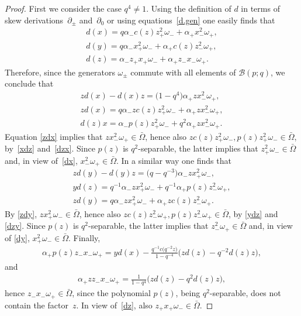 \documentclass[pdftex]{sigma}
\numberwithin{equation}{section}
\def\Weyl#1#2{{\mathcal{B}}(#1;#2)}
\begin{document}
\begin{proof}
First we consider the case $q^4\neq 1$. Using the def\/inition of $d$ in terms of skew derivations~$\partial_\pm$ and~$\partial_0$ or using equations~\eqref{d.gen} one easily f\/inds that
\begin{subequations}\label{d.gen.B}
\begin{gather}
d(x) = q\alpha_-c(z)z_+^2\omega_- + \alpha_+x_-^2 \omega_+, \label{dx}
\\
d(y) = q\alpha_-x_+^2\omega_- + \alpha_+c(z)z_-^2\omega_+ , \label{dy}
\\
d(z) = \alpha_-z_+x_+\omega_- + \alpha_+z_-x_- \omega_+. \label{dz}
\end{gather}
\end{subequations}
Therefore, since the generators $\omega_\pm$ commute with all elements of $\Weyl p q$, we conclude that
\begin{subequations}\label{xdz+zdx}
\begin{gather}
zd(x) - d(x)z = \big(1-q^4\big)\alpha_+ zx_-^2 \omega_+, \label{zdx}
\\
zd(x) = q\alpha_-zc(z)z_+^2\omega_- + \alpha_+zx_-^2 \omega_+, \label{xdz}
\\
d(z)x = \alpha_-p(z)z_+^2\omega_- + q^2\alpha_+zx_-^2 \omega_+. \label{dzx}
\end{gather}
\end{subequations}
Equation \eqref{zdx} implies that $zx_-^2 \omega_+\in \bar\Omega$, hence also $zc(z)z_+^2\omega_- , p(z)z_+^2\omega_- \in \bar\Omega$, by~\eqref{xdz} and~\eqref{dzx}. Since $p(z)$ is $q^2$-separable, the latter implies that $z_+^2\omega_- \in \bar\Omega$ and, in view of~\eqref{dx}, $x_-^2\omega_+\in \bar\Omega$. In a similar way one f\/inds that
\begin{subequations}\label{ydz+zdy}
\begin{gather}
zd(y) - d(y)z = \big(q-q^{-3}\big)\alpha_- zx_+^2 \omega_-, \label{zdy}
\\
yd(z) = q^{-1}\alpha_-zx_+^2\omega_- + q^{-1}\alpha_+p(z)z_-^2 \omega_+, \label{ydz}
\\
zd(y) = q\alpha_-zx_+^2\omega_- + \alpha_+zc(z)z_-^2 \omega_+. \label{dzy}
\end{gather}
\end{subequations}
By \eqref{zdy}, $zx_+^2 \omega_-\in \bar\Omega$, hence also $zc(z)z_-^2\omega_+, p(z)z_-^2\omega_+ \in \bar\Omega$, by \eqref{ydz} and \eqref{dzy}. Since $p(z)$ is $q^2$-separable, the latter implies that $z_-^2\omega_+ \in \bar\Omega$ and, in view of \eqref{dy}, $x_+^2\omega_-\in \bar\Omega$. Finally,
\begin{gather*}
\alpha_+ p(z)z_-x_-\omega_+ = yd(x) - \frac{q^{-1}c\big(q^{-2}z\big)}{1-q^{-4}}\big(zd(z) - q^{-2}d(z)z\big),
\end{gather*}
and
\begin{gather*}
\alpha_+ zz_-x_-\omega_+ =\frac{1}{1-q^{4}}\big(zd(z) - q^{2}d(z)z\big),
\end{gather*}
hence $z_-x_-\omega_+ \in \bar \Omega$, since the polynomial $p(z)$, being $q^2$-separable, does not contain the factor~$z$. In view of~\eqref{dz},
also $z_+x_+\omega_- \in \bar \Omega$.


\end{proof}
\end{document}
